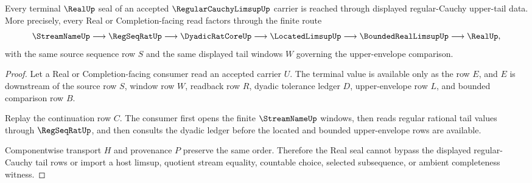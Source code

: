 \begin{theorem}
\label{thm:regular-cauchy-limsup-real-seal}
Every terminal $\RealUp$ seal of an accepted $\RegularCauchyLimsupUp$ carrier is reached through displayed regular-Cauchy upper-tail data. More precisely, every Real or Completion-facing read factors through the finite route
$$
\StreamNameUp \longrightarrow \RegSeqRatUp \longrightarrow \DyadicRatCoreUp \longrightarrow \LocatedLimsupUp \longrightarrow \BoundedRealLimsupUp \longrightarrow \RealUp ,
$$
with the same source sequence row $S$ and the same displayed tail windows $W$ governing the upper-envelope comparison.
\end{theorem}
\begin{proof}
Let a Real or Completion-facing consumer read an accepted carrier $U$. The terminal value is available only as the row $E$, and $E$ is downstream of the source row $S$, window row $W$, readback row $R$, dyadic tolerance ledger $D$, upper-envelope row $L$, and bounded comparison row $B$.

Replay the continuation row $C$. The consumer first opens the finite $\StreamNameUp$ windows, then reads regular rational tail values through $\RegSeqRatUp$, and then consults the dyadic ledger before the located and bounded upper-envelope rows are available.

Componentwise transport $H$ and provenance $P$ preserve the same order. Therefore the Real seal cannot bypass the displayed regular-Cauchy tail rows or import a host limsup, quotient stream equality, countable choice, selected subsequence, or ambient completeness witness.
\end{proof}



